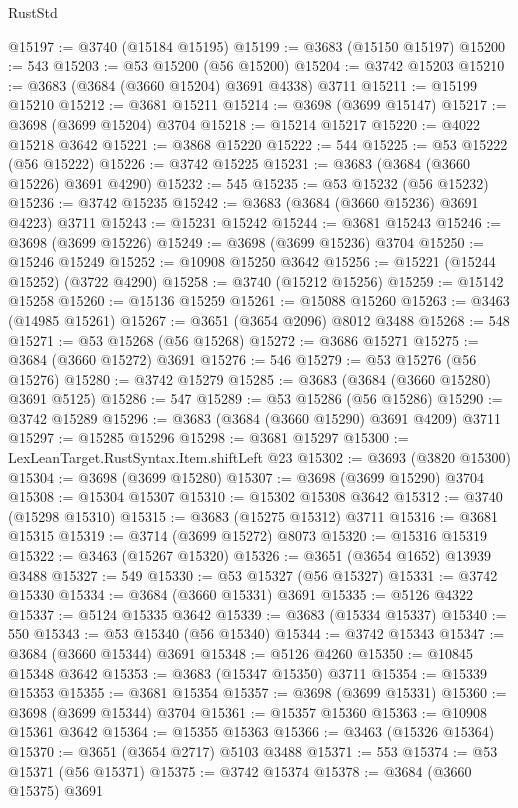 \begin{lexlean}{RustStd}
\begin{coremodule}
@15197 := @3740 (@15184 @15195)
@15199 := @3683 (@15150 @15197)
@15200 := 543
@15203 := @53 @15200 (@56 @15200)
@15204 := @3742 @15203
@15210 := @3683 (@3684 (@3660 @15204) @3691 @4338) @3711
@15211 := @15199 @15210
@15212 := @3681 @15211
@15214 := @3698 (@3699 @15147)
@15217 := @3698 (@3699 @15204) @3704
@15218 := @15214 @15217
@15220 := @4022 @15218 @3642
@15221 := @3868 @15220
@15222 := 544
@15225 := @53 @15222 (@56 @15222)
@15226 := @3742 @15225
@15231 := @3683 (@3684 (@3660 @15226) @3691 @4290)
@15232 := 545
@15235 := @53 @15232 (@56 @15232)
@15236 := @3742 @15235
@15242 := @3683 (@3684 (@3660 @15236) @3691 @4223) @3711
@15243 := @15231 @15242
@15244 := @3681 @15243
@15246 := @3698 (@3699 @15226)
@15249 := @3698 (@3699 @15236) @3704
@15250 := @15246 @15249
@15252 := @10908 @15250 @3642
@15256 := @15221 (@15244 @15252) (@3722 @4290)
@15258 := @3740 (@15212 @15256)
@15259 := @15142 @15258
@15260 := @15136 @15259
@15261 := @15088 @15260
@15263 := @3463 (@14985 @15261)
@15267 := @3651 (@3654 @2096) @8012 @3488
@15268 := 548
@15271 := @53 @15268 (@56 @15268)
@15272 := @3686 @15271
@15275 := @3684 (@3660 @15272) @3691
@15276 := 546
@15279 := @53 @15276 (@56 @15276)
@15280 := @3742 @15279
@15285 := @3683 (@3684 (@3660 @15280) @3691 @5125)
@15286 := 547
@15289 := @53 @15286 (@56 @15286)
@15290 := @3742 @15289
@15296 := @3683 (@3684 (@3660 @15290) @3691 @4209) @3711
@15297 := @15285 @15296
@15298 := @3681 @15297
@15300 := LexLeanTarget.RustSyntax.Item.shiftLeft @23
@15302 := @3693 (@3820 @15300)
@15304 := @3698 (@3699 @15280)
@15307 := @3698 (@3699 @15290) @3704
@15308 := @15304 @15307
@15310 := @15302 @15308 @3642
@15312 := @3740 (@15298 @15310)
@15315 := @3683 (@15275 @15312) @3711
@15316 := @3681 @15315
@15319 := @3714 (@3699 @15272) @8073
@15320 := @15316 @15319
@15322 := @3463 (@15267 @15320)
@15326 := @3651 (@3654 @1652) @13939 @3488
@15327 := 549
@15330 := @53 @15327 (@56 @15327)
@15331 := @3742 @15330
@15334 := @3684 (@3660 @15331) @3691
@15335 := @5126 @4322
@15337 := @5124 @15335 @3642
@15339 := @3683 (@15334 @15337)
@15340 := 550
@15343 := @53 @15340 (@56 @15340)
@15344 := @3742 @15343
@15347 := @3684 (@3660 @15344) @3691
@15348 := @5126 @4260
@15350 := @10845 @15348 @3642
@15353 := @3683 (@15347 @15350) @3711
@15354 := @15339 @15353
@15355 := @3681 @15354
@15357 := @3698 (@3699 @15331)
@15360 := @3698 (@3699 @15344) @3704
@15361 := @15357 @15360
@15363 := @10908 @15361 @3642
@15364 := @15355 @15363
@15366 := @3463 (@15326 @15364)
@15370 := @3651 (@3654 @2717) @5103 @3488
@15371 := 553
@15374 := @53 @15371 (@56 @15371)
@15375 := @3742 @15374
@15378 := @3684 (@3660 @15375) @3691

\end{coremodule}
\end{lexlean}
